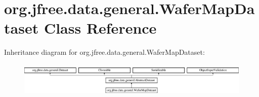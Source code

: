 \hypertarget{classorg_1_1jfree_1_1data_1_1general_1_1_wafer_map_dataset}{}\section{org.\+jfree.\+data.\+general.\+Wafer\+Map\+Dataset Class Reference}
\label{classorg_1_1jfree_1_1data_1_1general_1_1_wafer_map_dataset}
Inheritance diagram for org.\+jfree.\+data.\+general.\+Wafer\+Map\+Dataset\+:\begin{figure}[H]
\begin{center}
\leavevmode
\includegraphics[height=1.686747cm]{classorg_1_1jfree_1_1data_1_1general_1_1_wafer_map_dataset}
\end{center}
\end{figure}
